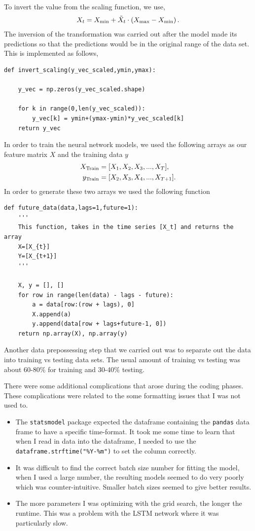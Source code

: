 \documentclass[10pt,a4paper]{article}
\begin{document}
To invert the value from the scaling function, we use,
\begin{equation}
X_{t} = X_{\rm min} + \tilde{X}_t\cdot \left(X_{\rm max} - X_{\rm min} \right).
\end{equation}
The inversion of the transformation was carried out after the model made its predictions so that the predictions would be in the original range of the data set. This is implemented as follows,
\begin{lstlisting}
def invert_scaling(y_vec_scaled,ymin,ymax):
    
    y_vec = np.zeros(y_vec_scaled.shape)
        
    for k in range(0,len(y_vec_scaled)):
        y_vec[k] = ymin+(ymax-ymin)*y_vec_scaled[k]
    return y_vec
\end{lstlisting}
In order to train the neural network models, we used the following arrays as our feature matrix $X$ and the training data $y$
\begin{align}
X_{\rm Train} &= [{X_{1},X_2,X_3, ..., X_T}], \\
y_{\rm Train} &= [{X_{2},X_3,X_4, ..., X_{T+1}}].
\end{align}
In order to generate these two arrays we used the following function
\begin{lstlisting}
def future_data(data,lags=1,future=1):
    '''
    This function, takes in the time series [X_t] and returns the array
    X=[X_{t}]
    Y=[X_{t+1}]
    '''
    
    X, y = [], []
    for row in range(len(data) - lags - future):
        a = data[row:(row + lags), 0]
        X.append(a)
        y.append(data[row + lags+future-1, 0])
    return np.array(X), np.array(y)
\end{lstlisting}
Another data prepossessing step that we carried out was to separate out the data into training vs testing data sets. The usual amount of training vs testing was about 60-80$\%$ for training and 30-40$\%$ testing.

There were some additional complications that arose during the coding phases. These complications were related to the some formatting issues that I was not used to.
\begin{itemize}
\item The \verb|statsmodel| package expected the dataframe containing the \verb|pandas| data frame to
have a specific time-format. It took me some time to learn that when I read in data into the dataframe, I needed to use the \verb|dataframe.strftime("%Y-%m")| to set the column correctly.
\item It was difficult to find the correct batch size number for fitting the model, when I used a large number, the resulting models seemed to do very poorly which was counter-intuitive. Smaller batch sizes seemed to give better results.
\item The more parameters I was optimizing with the grid search, the longer the runtime. This was a problem with the LSTM network where it was particularly slow.
\end{itemize}
\end{document}
